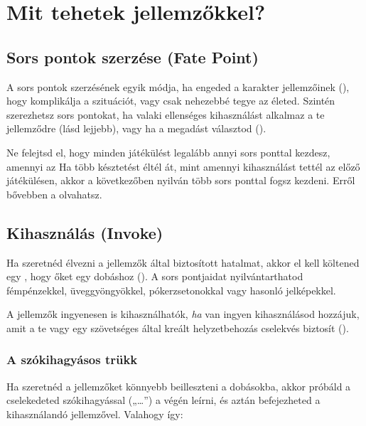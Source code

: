 \section{Mit tehetek jellemzőkkel?}

\label{Sors pontok szerzése}
\subsection[Sors pontok szerzése]{Sors pontok szerzése (Fate Point)}

A sors pontok szerzésének egyik módja, ha engeded a karakter jellemzőinek  (), hogy komplikálja a szituációt, vagy csak nehezebbé tegye az életed. Szintén szerezhetsz sors pontokat, ha valaki ellenséges kihasználást alkalmaz a te jellemződre (lásd lejjebb), vagy ha a megadást választod ().

Ne felejtsd el, hogy minden játékülést legalább annyi sors ponttal kezdesz, amennyi az  Ha több késztetést éltél át, mint amennyi kihasználást tettél az előző játékülésen, akkor a következőben nyilván több sors ponttal fogsz kezdeni. Erről bővebben a  olvahatsz.

\label{Kihasználás}
\subsection[Kihasználás]{Kihasználás (Invoke)}

Ha szeretnéd élvezni a jellemzők által biztosított hatalmat, akkor el kell költened egy , hogy  őket egy dobáshoz (). A sors pontjaidat nyilvántarthatod fémpénzekkel, üveggyöngyökkel, pókerzsetonokkal vagy hasonló jelképekkel.

A jellemzők ingyenesen is kihasználhatók, \emph{ha} van ingyen kihasználásod hozzájuk, amit a te vagy egy szövetséges által kreált helyzetbehozás cselekvés biztosít ().

\subsubsection{A szókihagyásos trükk}

Ha szeretnéd a jellemzőket könnyebb beilleszteni a dobásokba, akkor próbáld a cselekedeted szókihagyással („…”) a végén leírni, és aztán befejezheted a kihasználandó jellemzővel. Valahogy így:


